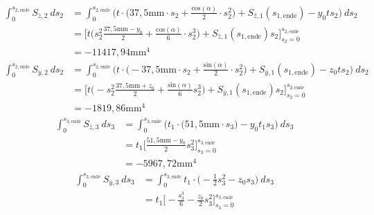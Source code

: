 \begin{itemize}
\begin{equation}
\begin{split}
		\end{split}
	\end{equation}
	\begin{equation}
		\begin{split}
			\int_{0}^{s_{2,\mathrm{ende}}} S_{\bar z,2}\ ds_2 &= \int_{0}^{s_{2,\mathrm{ende}}}  \bigg(t\cdot\bigg(37,5\mathrm{mm}\cdot s_2 +\frac{\mathrm{cos}(\alpha)}{2}\cdot s^2_2\bigg) + S_{\bar z,1}(s_{1,\mathrm{ende}})-y_0ts_2\bigg)\ ds_2\\\
			&=\bigg[t\bigg(s_2^2\frac{37,5\mathrm{mm}-y_0}{2}+\frac{\mathrm{cos}(\alpha)}{6}\cdot s^3_2\bigg)+S_{\bar z,1}(s_{1,\mathrm{ende}})s_2\bigg]_{s_2=0}^{s_{2,\mathrm{ende}}}\\\
			&= -11417,94\mathrm{mm}^4
		\end{split}
	\end{equation}
	\begin{equation}
		\begin{split}
			\int_{0}^{s_{2,\mathrm{ende}}} S_{\bar y,2}\ ds_2 &= \int_{0}^{s_{2,\mathrm{ende}}}\bigg( t\cdot\bigg(-37,5\mathrm{mm}\cdot s_2 +\frac{\mathrm{sin}(\alpha)}{2}\cdot s^2_2\bigg) + S_{\bar y,1}(s_{1,\mathrm{ende}}) - z_0ts_2\bigg)\ ds_2\\\
			&= \bigg[t\bigg(-s_2^2\frac{37,5\mathrm{mm}+z_0}{2}+\frac{\mathrm{sin}(\alpha)}{6}s_2^3\bigg)+S_{\bar y,1}(s_{1,\mathrm{ende}})s_2\bigg]_{s_2=0}^{s_{2,\mathrm{ende}}}\\\
			&=-1819,86\mathrm{mm}^4
		\end{split}
	\end{equation}
	\begin{equation}
		\begin{split}
			\int_{0}^{s_{3,\mathrm{ende}}} S_{\bar z,3}\ ds_3 &= \int_{0}^{s_{3,\mathrm{ende}}} \bigg(t_1\cdot\bigg(51,5\mathrm{mm}\cdot s_3\bigg) -y_0t_1s_3\bigg)\ ds_3\\\
			&=t_1\bigg[\frac{51,5\mathrm{mm}-y_0}{2}s_3^2\bigg]_{s_3=0}^{s_{3,\mathrm{ende}}}\\\
			&=-5967,72\mathrm{mm}^4
		\end{split}
	\end{equation}
	\begin{equation}
		\begin{split}
			\int_{0}^{s_{3,\mathrm{ende}}} S_{\bar y,3}\ ds_3 &= \int_{0}^{s_{3,\mathrm{ende}}} t_1\cdot\bigg(-\frac{1}{2}s^2_3-z_0s_3\bigg)\ ds_3\\\
			&=t_1\bigg[-\frac{s_3^3}{6}-\frac{z_0}{2}s_3^2\bigg]_{s_3=0}^{s_{3,\mathrm{ende}}}\\\

\end{split}
\end{equation}
\end{itemize}

